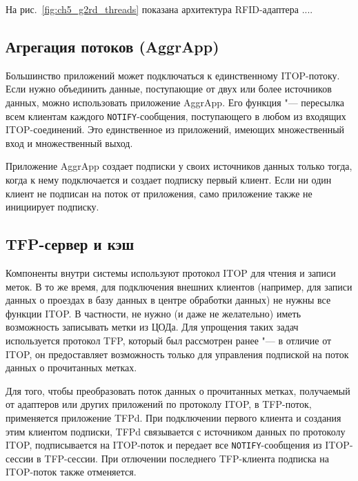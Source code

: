 На рис.~\ref{fig:ch5_g2rd_threads} показана архитектура RFID-адаптера ....



\subsection{Агрегация потоков (AggrApp)}

Большинство приложений может подключаться к единственному ITOP-потоку. Если нужно объединить данные, поступающие от двух или более источников данных, можно использовать приложение AggrApp. Его функция "--- пересылка всем клиентам каждого \texttt{NOTIFY}-сообщения, поступающего в любом из входящих ITOP-соединений. Это единственное из приложений, имеющих множественный вход и множественный выход.

Приложение AggrApp создает подписки у своих источников данных только тогда, когда к нему подключается и создает подписку первый клиент. Если ни один клиент не подписан на поток от приложения, само приложение также не инициирует подписку.


\subsection{TFP-сервер и кэш}

Компоненты внутри системы используют протокол ITOP для чтения и записи меток. В то же время, для подключения внешних клиентов (например, для записи данных о проездах в базу данных в центре обработки данных) не нужны все функции ITOP. В частности, не нужно (и даже не желательно) иметь возможность записывать метки из ЦОДа. Для упрощения таких задач используется протокол TFP, который был рассмотрен ранее "--- в отличие от ITOP, он предоставляет возможность только для управления подпиской на поток данных о прочитанных метках.

Для того, чтобы преобразовать поток данных о прочитанных метках, получаемый от адаптеров или других приложений по протоколу ITOP, в TFP-поток, применяется приложение TFPd. При подключении первого клиента и создания этим клиентом подписки, TFPd связывается с источником данных по протоколу ITOP, подписывается на ITOP-поток и передает все \texttt{NOTIFY}-сообщения из ITOP-сессии в TFP-сессии. При отлючении последнего TFP-клиента подписка на ITOP-поток также отменяется.

